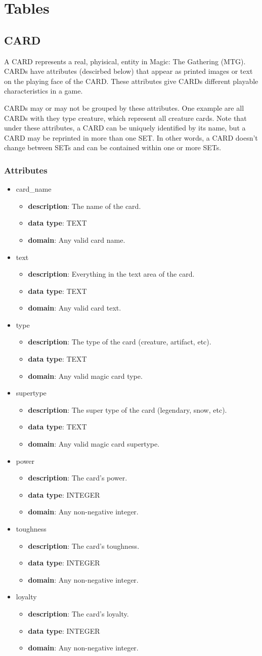 \documentclass{article}
\newcommand{\tablesection}[2] {
    \subsection{#1}  %
    #2  %
    \subsubsection{Attributes}
}
\newcommand{\attribute}[4] {
    \begin{itemize}
        \item {#1}  %
            \begin{itemize}
                \item \textbf{description}: #2  %
                \item \textbf{data type}: #3  %
                \item \textbf{domain}: #4  %
            \end{itemize}
    \end{itemize}
}
\begin{document}
\section{Tables}
\tablesection{CARD}{
    A CARD represents a real, phyisical, entity in Magic: The Gathering (MTG). CARDs have attributes (descirbed below) that appear as printed images or text on the playing face of the CARD. These attributes give CARDs different playable characteristics in a game. 

    CARDs may or may not be grouped by these attributes. One example are all CARDs with they type creature, which represent all creature cards.  Note that under these attributes, a CARD can be uniquely identified by its name, but a CARD may be reprinted in more than one SET.  In other words, a CARD doesn't change between SETs and can be contained within one or more SETs.  
}
\attribute{card\_name}{The name of the card.}{TEXT}{Any valid card name.}
\attribute{text}{Everything in the text area of the card.}{TEXT}{Any valid card text.}
\attribute{type}{The type of the card (creature, artifact, etc).}{TEXT}{Any valid magic card type.}
\attribute{supertype}{The super type of the card (legendary, snow, etc).}{TEXT}{Any valid magic card supertype.}
\attribute{power}{The card's power.}{INTEGER}{Any non-negative integer.}
\attribute{toughness}{The card's toughness.}{INTEGER}{Any non-negative integer.}
\attribute{loyalty}{The card's loyalty.}{INTEGER}{Any non-negative integer.}
\end{document}
